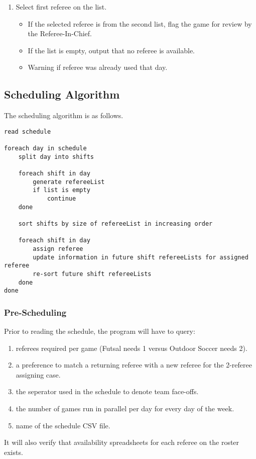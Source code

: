 \documentclass{article}
\begin{document}
\begin{enumerate}
\begin{enumerate}
\end{enumerate}
\item Select first referee on the list.
\begin{itemize}
\item If the selected referee is from the second list, flag the game for review by the Referee-In-Chief.
\item If the list is empty, output that no referee is available.
\item Warning if referee was already used that day.
\end{itemize}
\end{enumerate}

\subsection{Scheduling Algorithm}
The scheduling algorithm is as follows.

\begin{verbatim}
read schedule

foreach day in schedule
    split day into shifts

    foreach shift in day
        generate refereeList
        if list is empty
            continue
    done

    sort shifts by size of refereeList in increasing order

    foreach shift in day
        assign referee
        update information in future shift refereeLists for assigned referee
        re-sort future shift refereeLists
    done
done
\end{verbatim}

\subsubsection{Pre-Scheduling}
Prior to reading the schedule, the program will have to query:
\begin{enumerate}
\item referees required per game (Futsal needs 1 versus Outdoor Soccer needs 2).
\item a preference to match a returning referee with a new referee for the 2-referee assigning case.
\item the seperator used in the schedule to denote team face-offs.
\item the number of games run in parallel per day for every day of the week.
\item name of the schedule CSV file.
\end{enumerate}
It will also verify that availability spreadsheets for each referee on the roster exists.
\end{document}

